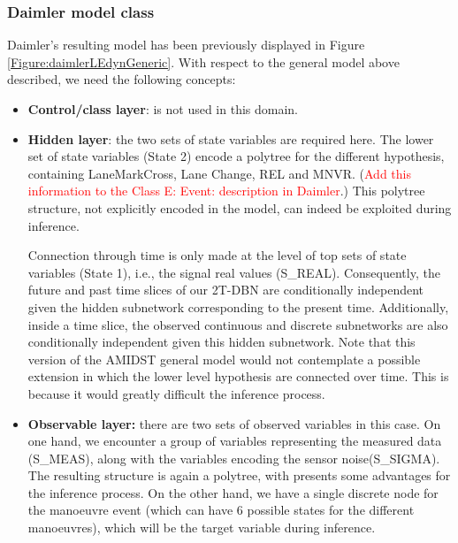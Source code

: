 \subsubsection{Daimler model class}\label{daimlerAMIDSTModels}

Daimler's resulting model has been previously displayed in Figure \ref{Figure:daimlerLEdynGeneric}. With respect to the general model above described, we need the following concepts:

\begin{itemize}
\item \textbf{Control/class layer}: is not used in this domain.

\item \textbf{Hidden layer}: the two sets of state variables are required here. The lower set of state variables (State 2) encode a polytree \cite{JensenNielsen2007} for the different hypothesis, containing LaneMarkCross, Lane Change, REL and MNVR. (\textcolor{red}{Add this information to the Class E: Event: description in Daimler}.) This polytree structure, not explicitly encoded in the model, can indeed be exploited during inference.

Connection through time is only made at the level of top sets of state variables (State 1), i.e., the signal real values (S\_REAL). Consequently, the future and past time slices of our 2T-DBN are conditionally independent given the hidden subnetwork corresponding to the present time. Additionally, inside a time slice, the observed continuous and discrete subnetworks are also conditionally independent given this hidden subnetwork. Note that this version of the AMIDST general model would not contemplate a possible extension in which the lower level hypothesis are connected over time. This is because it would greatly difficult the inference process. 



\item \textbf{Observable layer:} there are two sets of observed variables in this case. On one hand, we encounter a group of variables representing the measured data (S\_MEAS), along with the variables encoding the sensor noise(S\_SIGMA). The resulting structure is again a polytree, with presents some advantages for the inference process. On the other hand, we have a single discrete node for the manoeuvre event (which can have 6 possible states for the different manoeuvres), which will be the target variable during inference. 
\end{itemize}


